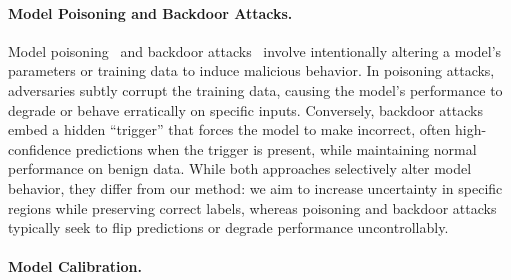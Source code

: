 \paragraph{Model Poisoning and Backdoor Attacks.}
Model poisoning~\citep{steinhardt2017certified} and backdoor attacks~\citep{wang2019neural} involve intentionally altering a model’s parameters or training data to induce malicious behavior. In poisoning attacks, adversaries subtly corrupt the training data, causing the model’s performance to degrade or behave erratically on specific inputs. Conversely, backdoor attacks embed a hidden ``trigger'' that forces the model to make incorrect, often high-confidence predictions when the trigger is present, while maintaining normal performance on benign data. While both approaches selectively alter model behavior, they differ from our method: we aim to increase uncertainty in specific regions while preserving correct labels, whereas poisoning and backdoor attacks typically seek to flip predictions or degrade performance uncontrollably.

\paragraph{Model Calibration.}

